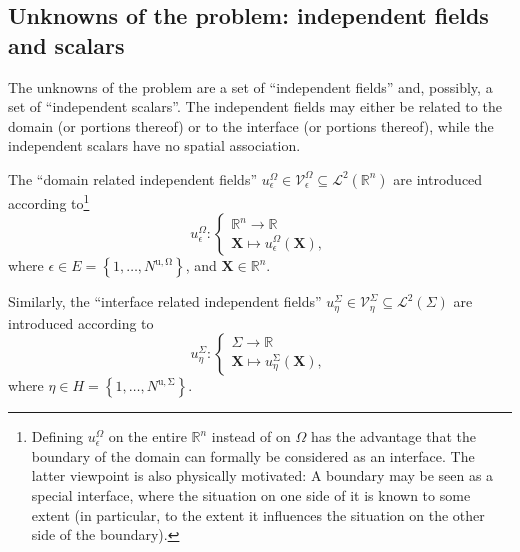 \documentclass[pdftex,a4paper,12pt,abstracton]{scrartcl}
\begin{document}
\subsection{Unknowns of the problem: independent fields and scalars}
The unknowns of the problem are a set of ``independent fields'' and, possibly, a set of ``independent scalars''. The independent fields may either be related to the domain (or portions thereof) or to the interface (or portions thereof), while the independent scalars have no spatial association.

The ``domain related independent fields'' $u^\Omega_\epsilon \in \mathcal{V}^\Omega_\epsilon \subseteq \mathcal{L}^2(\mathbb{R}^n)$ are introduced according to\footnote{Defining $u^\Omega_\epsilon$ on the entire $\mathbb{R}^n$ instead of on  $\Omega$ has the advantage that the boundary of the domain can formally be considered as an interface. The latter viewpoint is also physically motivated: A boundary may be seen as a special interface, where the situation on one side of it is known to some extent (in particular, to the extent it influences the situation on the other side of the boundary).}
\begin{equation}
u^\Omega_\epsilon:
\begin{cases}
\mathbb{R}^n \rightarrow \mathbb{R}\\
\boldsymbol{X} \mapsto u^\Omega_\epsilon(\boldsymbol{X}),
\end{cases}
\end{equation}
where $\epsilon \in E=\left\{1, \hdots, N^\mathrm{u,\Omega}\right\}$, and $\boldsymbol{X}\in \mathbb{R}^n$.

Similarly, the ``interface related independent fields'' $u^\Sigma_\eta \in \mathcal{V}^\Sigma_\eta \subseteq \mathcal{L}^2(\Sigma)$ are introduced according to
\begin{equation}
u^\Sigma_\eta:
\begin{cases}
\Sigma \rightarrow \mathbb{R}\\
\boldsymbol{X} \mapsto u^\mathrm{\Sigma}_\eta(\boldsymbol{X}),
\end{cases}
\end{equation}
where $\eta \in H=\left\{1, \hdots, N^\mathrm{u,\Sigma}\right\}$.
\end{document}
